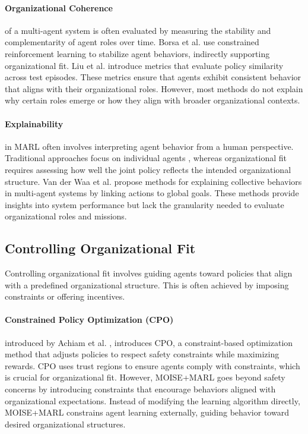 \documentclass[sigconf,anonymous]{aamas}
\begin{document}
\paragraph{Organizational Coherence}
of a multi-agent system is often evaluated by measuring the stability and complementarity of agent roles over time. Borsa et al. \cite{borsa2019constrained} use constrained reinforcement learning to stabilize agent behaviors, indirectly supporting organizational fit.
Liu et al. \cite{liu2021efficient} introduce metrics that evaluate policy similarity across test episodes. These metrics ensure that agents exhibit consistent behavior that aligns with their organizational roles. However, most methods do not explain why certain roles emerge or how they align with broader organizational contexts.

\paragraph{Explainability}
in MARL often involves interpreting agent behavior from a human perspective. Traditional approaches focus on individual agents \cite{van2018explainable}, whereas organizational fit requires assessing how well the joint policy reflects the intended organizational structure.
Van der Waa et al. \cite{van2020explainability} propose methods for explaining collective behaviors in multi-agent systems by linking actions to global goals. These methods provide insights into system performance but lack the granularity needed to evaluate organizational roles and missions.

\subsection{Controlling Organizational Fit}
Controlling organizational fit involves guiding agents toward policies that align with a predefined organizational structure. This is often achieved by imposing constraints or offering incentives.

\paragraph{Constrained Policy Optimization (CPO)}
introduced by Achiam et al. \cite{achiam2017cpo}, introduces CPO, a constraint-based optimization method that adjusts policies to respect safety constraints while maximizing rewards. CPO uses trust regions to ensure agents comply with constraints, which is crucial for organizational fit. However, MOISE+MARL goes beyond safety concerns by introducing constraints that encourage behaviors aligned with organizational expectations. Instead of modifying the learning algorithm directly, MOISE+MARL constrains agent learning externally, guiding behavior toward desired organizational structures.
\end{document}
